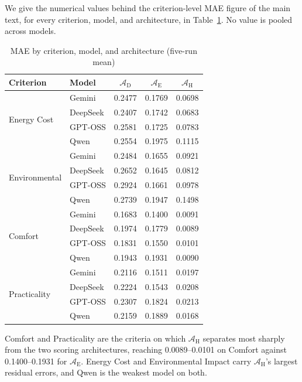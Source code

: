 \documentclass[11pt]{article}
\begin{document}
We give the numerical values behind the criterion-level MAE figure of the main text, for every criterion, model, and architecture, in Table~\ref{tab:mae_by_criterion}. No value is pooled across models.

\begin{table}[htbp]
\centering
\caption{MAE by criterion, model, and architecture (five-run mean)}
\label{tab:mae_by_criterion}
\begin{tabular}{@{}l l ccc@{}}
\toprule
Criterion & Model & $\mathcal{A}_{\text{D}}$ & $\mathcal{A}_{\text{E}}$ & $\mathcal{A}_{\text{H}}$ \\
\midrule
\multirow{4}{*}{Energy Cost}
 & Gemini   & 0.2477 & 0.1769 & 0.0698 \\
 & DeepSeek & 0.2407 & 0.1742 & 0.0683 \\
 & GPT-OSS  & 0.2581 & 0.1725 & 0.0783 \\
 & Qwen     & 0.2554 & 0.1975 & 0.1115 \\
\midrule
\multirow{4}{*}{Environmental}
 & Gemini   & 0.2484 & 0.1655 & 0.0921 \\
 & DeepSeek & 0.2652 & 0.1645 & 0.0812 \\
 & GPT-OSS  & 0.2924 & 0.1661 & 0.0978 \\
 & Qwen     & 0.2739 & 0.1947 & 0.1498 \\
\midrule
\multirow{4}{*}{Comfort}
 & Gemini   & 0.1683 & 0.1400 & 0.0091 \\
 & DeepSeek & 0.1974 & 0.1779 & 0.0089 \\
 & GPT-OSS  & 0.1831 & 0.1550 & 0.0101 \\
 & Qwen     & 0.1943 & 0.1931 & 0.0090 \\
\midrule
\multirow{4}{*}{Practicality}
 & Gemini   & 0.2116 & 0.1511 & 0.0197 \\
 & DeepSeek & 0.2224 & 0.1543 & 0.0208 \\
 & GPT-OSS  & 0.2307 & 0.1824 & 0.0213 \\
 & Qwen     & 0.2159 & 0.1889 & 0.0168 \\
\bottomrule
\end{tabular}
\end{table}

Comfort and Practicality are the criteria on which $\mathcal{A}_{\text{H}}$ separates most sharply from the two scoring architectures, reaching 0.0089--0.0101 on Comfort against 0.1400--0.1931 for $\mathcal{A}_{\text{E}}$. Energy Cost and Environmental Impact carry $\mathcal{A}_{\text{H}}$'s largest residual errors, and Qwen is the weakest model on both.
\end{document}
